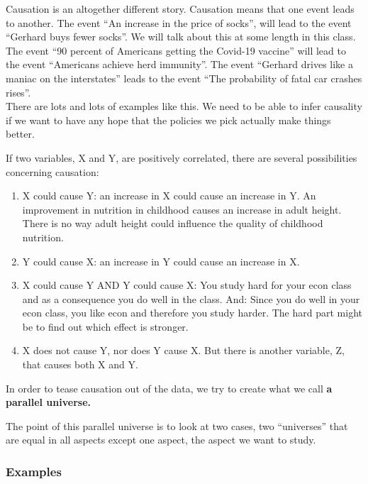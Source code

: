 \documentclass[
]{book}
\providecommand{\tightlist}{%
  \setlength{\itemsep}{0pt}\setlength{\parskip}{0pt}}
\begin{document}
Causation is an altogether different story. Causation means that one event leads to another. The event ``An increase in the price of socks'', will lead to the event ``Gerhard buys fewer socks''. We will talk about this at some length in this class. The event ``90 percent of Americans getting the Covid-19 vaccine'' will lead to the event ``Americans achieve herd immunity''. The event ``Gerhard drives like a maniac on the interstates'' leads to the event ``The probability of fatal car crashes rises''.\\
There are lots and lots of examples like this. We need to be able to infer causality if we want to have any hope that the policies we pick actually make things better.

If two variables, X and Y, are positively correlated, there are several possibilities concerning causation:

\begin{enumerate}
\def\labelenumi{\arabic{enumi}.}
\tightlist
\item
  X could cause Y: an increase in X could cause an increase in Y. An improvement in nutrition in childhood causes an increase in adult height. There is no way adult height could influence the quality of childhood nutrition.
\item
  Y could cause X: an increase in Y could cause an increase in X.
\item
  X could cause Y AND Y could cause X: You study hard for your econ class and as a consequence you do well in the class. And: Since you do well in your econ class, you like econ and therefore you study harder. The hard part might be to find out which effect is stronger.
\item
  X does not cause Y, nor does Y cause X. But there is another variable, Z, that causes both X and Y.
\end{enumerate}

In order to tease causation out of the data, we try to create what we call \textbf{a parallel universe.}

The point of this parallel universe is to look at two cases, two ``universes'' that are equal in all aspects except one aspect, the aspect we want to study.

\hypertarget{examples-2}{%
\subsubsection{Examples}\label{examples-2}}
\end{document}
